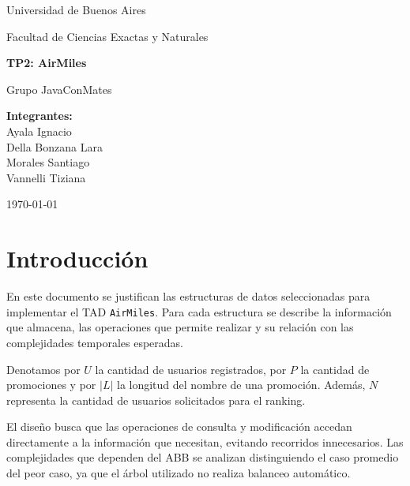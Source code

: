 \documentclass[12pt,a4paper]{article}
\begin{document}
\begin{titlepage}
    \centering

    \vspace*{3cm}

    {\Large Universidad de Buenos Aires\par}
    \vspace{0.3cm}
    {\large Facultad de Ciencias Exactas y Naturales\par}

    \vspace{2cm}

    {\huge\bfseries TP2: AirMiles\par}
    \vspace{0.5cm}
    {\LARGE Grupo JavaConMates\par}

    \vspace{2cm}

    \textbf{Integrantes:}\\[0.3cm]
    Ayala Ignacio\\
    Della Bonzana Lara\\
    Morales Santiago\\
    Vannelli Tiziana

    \vfill

    {\large \today\par}
\end{titlepage}

\section{Introducción}

En este documento se justifican las estructuras de datos
seleccionadas para implementar el TAD \texttt{AirMiles}.
Para cada estructura se describe la información que almacena,
las operaciones que permite realizar y su relación con las
complejidades temporales esperadas.

Denotamos por $U$ la cantidad de usuarios registrados,
por $P$ la cantidad de promociones y por $|L|$ la longitud
del nombre de una promoción. Además, $N$ representa la
cantidad de usuarios solicitados para el ranking.

El diseño busca que las operaciones de consulta y modificación
accedan directamente a la información que necesitan, evitando
recorridos innecesarios. Las complejidades que dependen del
ABB se analizan distinguiendo el caso promedio del peor caso,
ya que el árbol utilizado no realiza balanceo automático.
\end{document}
